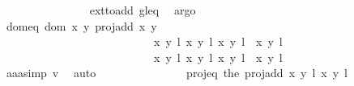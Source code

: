 \begin{isabellebody}
\ \ \ \ \ \ \ \ \ \ \ \ \ \ \isamarkupfalse%
\ ext{\isacharunderscore}to{\isacharunderscore}add\ gl{\isacharunderscore}eq\ \isamarkupfalse%
\ argo\isanewline
\ \ \ \ \ \ \ \ \ \ \ \ \isamarkupfalse%
\ dom{\isacharunderscore}eq{\isacharcolon}\ {\isachardoublequoteopen}{\isacharparenleft}dom\ {\isacharparenleft}{\isasymlambda}{\isacharparenleft}x{\isacharcomma}\ y{\isacharparenright}{\isachardot}\ proj{\isacharunderscore}add\ x\ y{\isacharparenright}\ {\isasyminter}\isanewline
\ \ \ \ \ \ \ \ \ \ \ \ \ \ \ \ \ \ \ \ \ \ \ \ \ \ \ {\isacharbraceleft}{\isacharparenleft}{\isacharparenleft}{\isacharparenleft}x{\isacharcomma}\ y{\isacharparenright}{\isacharcomma}\ l{\isacharparenright}{\isacharcomma}\ {\isacharparenleft}x{\isacharprime}{\isacharcomma}\ y{\isacharprime}{\isacharparenright}{\isacharcomma}\ l{\isacharprime}{\isacharparenright}{\isacharcomma}\ {\isacharparenleft}{\isacharparenleft}{\isacharparenleft}x{\isacharcomma}\ y{\isacharparenright}{\isacharcomma}\ l{\isacharparenright}{\isacharcomma}\ {\isasymtau}\ {\isacharparenleft}x{\isacharprime}{\isacharcomma}\ y{\isacharprime}{\isacharparenright}{\isacharcomma}\ l{\isacharprime}\ {\isacharplus}\ {}{\isacharparenright}{\isacharbraceright}{\isacharparenright}\ {\isacharequal}\isanewline
\ \ \ \ \ \ \ \ \ \ \ \ \ \ \ \ \ \ \ \ \ \ \ \ \ \ \ {\isacharbraceleft}{\isacharparenleft}{\isacharparenleft}{\isacharparenleft}x{\isacharcomma}\ y{\isacharparenright}{\isacharcomma}\ l{\isacharparenright}{\isacharcomma}\ {\isacharparenleft}x{\isacharprime}{\isacharcomma}\ y{\isacharprime}{\isacharparenright}{\isacharcomma}\ l{\isacharprime}{\isacharparenright}{\isacharcomma}\ {\isacharparenleft}{\isacharparenleft}{\isacharparenleft}x{\isacharcomma}\ y{\isacharparenright}{\isacharcomma}\ l{\isacharparenright}{\isacharcomma}\ {\isasymtau}\ {\isacharparenleft}x{\isacharprime}{\isacharcomma}\ y{\isacharprime}{\isacharparenright}{\isacharcomma}\ l{\isacharprime}\ {\isacharplus}\ {}{\isacharparenright}{\isacharbraceright}\ {\isachardoublequoteclose}\isanewline
\ \ \ \ \ \ \ \ \ \ \ \ \ \ \isamarkupfalse%
\ aaa{\isacharunderscore}simp\ v{}\ \isamarkupfalse%
\ auto\isanewline
\ \ \ \ \ \ \ \ \ \ \ \ \isamarkupfalse%
\ \isamarkupfalse%
\ proj{\isacharunderscore}eq{\isacharcolon}\ {\isachardoublequoteopen}{\isacharbraceleft}the\ {\isacharparenleft}proj{\isacharunderscore}add\ {\isacharparenleft}{\isacharparenleft}x{\isacharcomma}\ y{\isacharparenright}{\isacharcomma}\ l{\isacharparenright}\ {\isacharparenleft}{\isacharparenleft}x{\isacharprime}{\isacharcomma}\ y{\isacharprime}{\isacharparenright}{\isacharcomma}\ l{\isacharprime}{\isacharparenright}{\isacharparenright}{\isacharcomma}\isanewline

\end{isabellebody}
